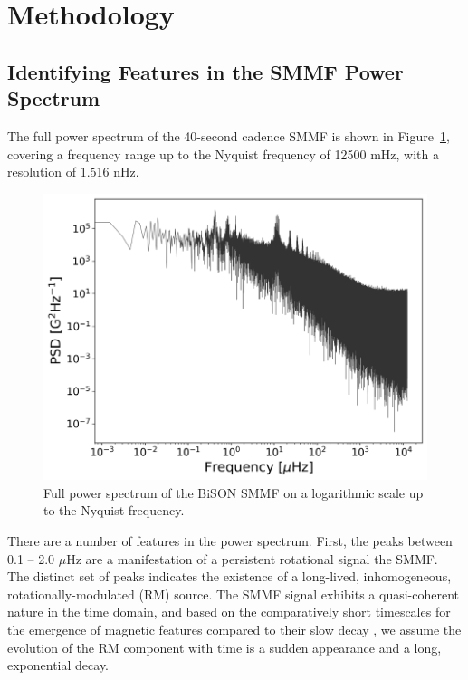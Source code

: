 \section{Methodology}\label{sec:SMMF_method}


\subsection{Identifying Features in the SMMF Power Spectrum}

The full power spectrum of the 40-second cadence SMMF is shown in Figure~\ref{fig:BiSON_FT_full}, covering a frequency range up to the Nyquist frequency of 12500 mHz, with a resolution of 1.516 nHz. 

\begin{figure}[ht!]
	\centering
	\includegraphics[width=\columnwidth]{BiSON_SMMF_FT_full_rescaled.png}
	\caption{Full power spectrum of the BiSON SMMF on a logarithmic scale up to the Nyquist frequency.}
	\label{fig:BiSON_FT_full}
\end{figure}

There are a number of features in the power spectrum. First, the peaks between 0.1 -- 2.0 $\mu\mathrm{Hz}$ are a manifestation of a persistent rotational signal the SMMF. The distinct set of peaks indicates the existence of a long-lived, inhomogeneous, rotationally-modulated (RM) source. The SMMF signal exhibits a quasi-coherent nature in the time domain, and based on the comparatively short timescales for the emergence of magnetic features compared to their slow decay \citep{zwaan_solar_1981, harvey_properties_1993, hathaway_sunspot_2008}, we assume the evolution of the RM component with time is a sudden appearance and a long, exponential decay.

